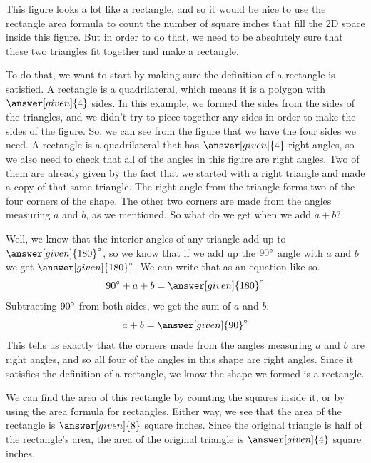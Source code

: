 \documentclass{ximera}
\begin{document}
\begin{example}
This figure looks a lot like a rectangle, and so it would be nice to use the rectangle area formula to count the number of square inches that fill the 2D space inside this figure. But in order to do that, we need to be absolutely sure that these two triangles fit together and make a rectangle.

To do that, we want to start by making sure the definition of a rectangle is satisfied. A rectangle is a quadrilateral, which means it is a polygon with $\answer[given]{4}$ sides. In this example, we formed the sides from the sides of the triangles, and we didn't try to piece together any sides in order to make the sides of the figure. So, we can see from the figure that we have the four sides we need. A rectangle is a quadrilateral that has $\answer[given]{4}$ right angles, so we also need to check that all of the angles in this figure are right angles. Two of them are already given by the fact that we started with a right triangle and made a copy of that same triangle. The right angle from the triangle forms two of the four corners of the shape. The other two corners are made from the angles measuring $a$ and $b$, as we mentioned. So what do we get when we add $a+b$?

Well, we know that the interior angles of any triangle add up to $\answer[given]{180}\degree$, so we know that if we add up the $90\degree$ angle with $a$ and $b$ we get $\answer[given]{180}\degree$. We can write that as an equation like so.
\[
90\degree + a + b = \answer[given]{180}\degree
\]
Subtracting $90\degree$ from both sides, we get the sum of $a$ and $b$.
\[
a+b=\answer[given]{90}\degree
\]
This tells us exactly that the corners made from the angles measuring $a$ and $b$ are right angles, and so all four of the angles in this shape are right angles. Since it satisfies the definition of a rectangle, we know the shape we formed is a rectangle.

We can find the area of this rectangle by counting the squares inside it, or by using the area formula for rectangles. Either way, we see that the area of the rectangle is $\answer[given]{8}$ square inches. Since the original triangle is half of the rectangle's area, the area of the original triangle is $\answer[given]{4}$ square inches.


\end{example}
\end{document}
